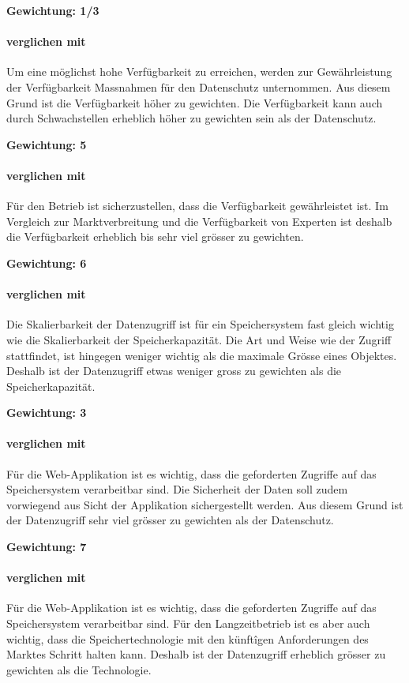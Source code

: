 \textbf{Gewichtung: 1/3}

\paragraph*{ verglichen mit }
Um eine möglichst hohe Verfügbarkeit zu erreichen, werden zur Gewährleistung der Verfügbarkeit Massnahmen für den Datenschutz unternommen. Aus diesem Grund ist die Verfügbarkeit höher zu gewichten. 
Die Verfügbarkeit kann auch durch Schwachstellen erheblich höher zu gewichten sein als der Datenschutz.

\textbf{Gewichtung: 5}

\paragraph*{ verglichen mit }
Für den Betrieb ist sicherzustellen, dass die Verfügbarkeit gewährleistet ist. Im Vergleich zur Marktverbreitung und die Verfügbarkeit von Experten ist deshalb die Verfügbarkeit erheblich bis sehr viel grösser zu gewichten.

\textbf{Gewichtung: 6}

\paragraph*{ verglichen mit }
Die Skalierbarkeit der Datenzugriff ist für ein Speichersystem fast gleich wichtig wie die Skalierbarkeit der Speicherkapazität. Die Art und Weise wie der Zugriff stattfindet, ist hingegen weniger wichtig als die maximale Grösse eines Objektes. Deshalb ist der Datenzugriff etwas weniger gross zu gewichten als die Speicherkapazität. 

\textbf{Gewichtung: 3}

\paragraph*{ verglichen mit }
Für die Web-Applikation ist es wichtig, dass die geforderten Zugriffe auf das Speichersystem verarbeitbar sind. Die Sicherheit der Daten soll zudem vorwiegend aus Sicht der Applikation sichergestellt werden. Aus diesem Grund ist der Datenzugriff sehr viel grösser zu gewichten als der Datenschutz.

\textbf{Gewichtung: 7}

\paragraph*{ verglichen mit }
Für die Web-Applikation ist es wichtig, dass die geforderten Zugriffe auf das Speichersystem verarbeitbar sind. Für den Langzeitbetrieb ist es aber auch wichtig, dass die Speichertechnologie mit den künftîgen Anforderungen des Marktes Schritt halten kann. Deshalb ist der Datenzugriff erheblich grösser zu gewichten als die Technologie.

